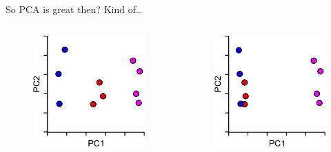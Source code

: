\begin{frame}[allowframebreaks]{So PCA is great then?}
    Kind of\dots
    \begin{columns}
    \begin{column}{0.5\textwidth}
        \begin{figure}
            \centering
            \includegraphics[width=1\textwidth,keepaspectratio]{images/dul/dim-reduce/pca-nonlinear-separation-1.png}
        \end{figure}
    \end{column}
    \begin{column}{0.5\textwidth}
        \begin{figure}
            \centering
            \includegraphics[width=1\textwidth,keepaspectratio]{images/dul/dim-reduce/pca-nonlinear-separation-2.png}

\end{figure}
\end{column}
\end{columns}
\end{frame}
